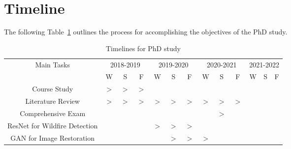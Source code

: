 \section{Timeline} \label{timeline}
The following Table~\ref{table:timeline} outlines the process for accomplishing the objectives of the PhD study.
\begin{table}[!ht]
    \centering
    \caption{Timelines for PhD study}
    \label{table:timeline}
        \resizebox{\textwidth}{!}
        {
        \begin{tabular}{c c c c c c c c c c c c c}
        \toprule
        \multirow{2}{6cm}{
        \centering
        Main Tasks
        }&
        \multicolumn{3}{c}{
        2018-2019
        }&
        \multicolumn{3}{c}{
        2019-2020
        } &
        \multicolumn{3}{c}{
        2020-2021
        } &
        \multicolumn{3}{c}{
        2021-2022
        }\\
        &
        \cellcolor{mygray}W& \cellcolor{mygray}S& \cellcolor{mygray}F&
        W& S& F&
        \cellcolor{mygray}W& \cellcolor{mygray}S& \cellcolor{mygray}F&
        W& S& F\\
        \hline
        Course Study&
        \cellcolor{mygray}$>$& \cellcolor{mygray}$>$& \cellcolor{mygray}$>$&
        & & & 
        \cellcolor{mygray}& \cellcolor{mygray}& \cellcolor{mygray}&
        & & \\
        
        Literature Review&
        \cellcolor{mygray}$>$& \cellcolor{mygray}$>$& \cellcolor{mygray}$>$&
        $>$& $>$& $>$& 
        \cellcolor{mygray}$>$& \cellcolor{mygray}$>$& \cellcolor{mygray}$>$&
        & & \\
        
        Comprehensive Exam &
        \cellcolor{mygray}& \cellcolor{mygray}& \cellcolor{mygray}&
        & & &
        \cellcolor{mygray}& \cellcolor{mygray}$>$& \cellcolor{mygray}&
        & & \\
        
        ResNet for Wildfire Detection&
        \cellcolor{mygray}& \cellcolor{mygray}& \cellcolor{mygray}&
        $>$& $>$& $>$&
        \cellcolor{mygray}& \cellcolor{mygray}& \cellcolor{mygray}&
        & & \\
        
        GAN for Image Restoration&
        \cellcolor{mygray}& \cellcolor{mygray}& \cellcolor{mygray}&
        & $>$& $>$& 
        \cellcolor{mygray}$>$& \cellcolor{mygray}& \cellcolor{mygray}&
        & &  \\
        

\end{tabular}}
\end{table}
